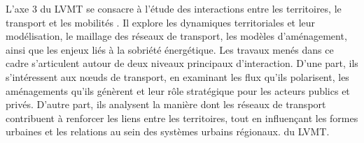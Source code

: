 {    L’axe 3  du \acrfull{LVMT} se consacre à l’étude des interactions entre les territoires, le transport et les mobilités \textcolor{blue}{\autocite{laboratoire_ville_mobilite_transport_axe_2024}}. Il explore les dynamiques territoriales et leur modélisation, le maillage des réseaux de transport, les modèles d’aménagement, ainsi que les enjeux liés à la sobriété énergétique. Les travaux menés dans ce cadre s’articulent autour de deux niveaux principaux d’interaction. D’une part, ils s’intéressent aux nœuds de transport, en examinant les flux qu’ils polarisent, les aménagements qu’ils génèrent et leur rôle stratégique pour les acteurs publics et privés. D’autre part, ils analysent la manière dont les réseaux de transport contribuent à renforcer les liens entre les territoires, tout en influençant les formes urbaines et les relations au sein des systèmes urbains régionaux.
} du \acrshort{LVMT}.%